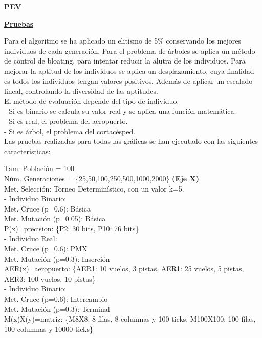 \begin{flushleft}
	\textbf{PEV}
	\begin{mdframed}[roundcorner=5pt]
		\textbf{\underline{Pruebas}}
		\vspace{0.1cm}
		
		\scriptsize		
		Para el algoritmo se ha aplicado un elitismo de 5\% conservando los mejores individuos de cada generación. Para el problema de árboles se aplica un método de control de bloating, para intentar reducir la alutra de los individuos. 		
		Para mejorar la aptitud de los individuos se aplica un desplazamiento, cuya finalidad es todos los individuos tengan valores positivos. Además de aplicar un escalado lineal, controlando la diversidad de las aptitudes.\\
			
		El método de evaluación depende del tipo de individuo. \\
		- Si es binario se calcula su valor real y se aplica una función matemática.  \\
		- Si es real, el problema del aeropuerto. \\
		- Si es árbol, el problema del cortacésped.\\
		
		Las pruebas realizadas para todas las gráficas se han ejecutado con las siguientes características:
		\begin{tcolorbox}[boxrule=0.5pt, fontupper=\small]
			\scriptsize
			Tam. Población = 100\\
			Núm. Generaciones = \{25,50,100,250,500,1000,2000\} \textbf{(Eje X)}\\
			Met. Selección: Torneo Determinístico, con un valor k=5.\\
			
			- Individuo Binario:\\
			Met. Cruce (p=0.6): Básica\\
			Met. Mutación (p=0.05): Básica \\
			P(x)=precision: \{P2: 30 bits, P10: 76 bits\}\\
			
			- Individuo Real:\\
			Met. Cruce (p=0.6): PMX\\
			Met. Mutación (p=0.3): Inserción \\
			AER(x)=aeropuerto: \{AER1: 10 vuelos, 3 pistas, AER1: 25 vuelos, 5 pistas, AER3: 100 vuelos, 10 pistas\}\\
			
			- Individuo Binario:\\
			Met. Cruce (p=0.6): Intercambio\\
			Met. Mutación (p=0.3): Terminal \\
			M(x)X(y)=matriz: \{M8X8: 8 filas, 8 columnas y 100 ticks; M100X100: 100 filas, 100 columnas y 10000 ticks\}
			
			
			
						
		\end{tcolorbox}
		
	\end{mdframed}
\end{flushleft}


